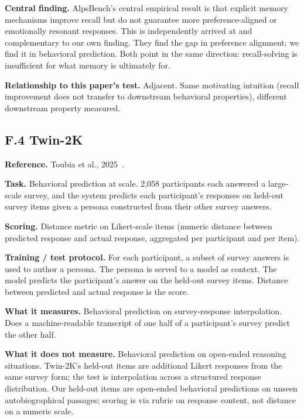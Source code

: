 \textbf{Central finding.} AlpsBench's central empirical result is that
explicit memory mechanisms improve recall but do not guarantee more
preference-aligned or emotionally resonant responses. This is
independently arrived at and complementary to our own finding. They find
the gap in preference alignment; we find it in behavioral prediction.
Both point in the same direction: recall-solving is insufficient for
what memory is ultimately for.

\textbf{Relationship to this paper's test.} Adjacent. Same motivating
intuition (recall improvement does not transfer to downstream behavioral
properties), different downstream property measured.

\hypertarget{f.4-twin-2k}{%
\subsection{F.4 Twin-2K}\label{f.4-twin-2k}}

\textbf{Reference.} Toubia et al., 2025~\citep{toubia2025twin2k}.

\textbf{Task.} Behavioral prediction at scale. 2,058 participants each
answered a large-scale survey, and the system predicts each
participant's responses on held-out survey items given a persona
constructed from their other survey answers.

\textbf{Scoring.} Distance metric on Likert-scale items (numeric
distance between predicted response and actual response, aggregated per
participant and per item).

\textbf{Training / test protocol.} For each participant, a subset of
survey answers is used to author a persona. The persona is served to a
model as context. The model predicts the participant's answer on the
held-out survey items. Distance between predicted and actual response is
the score.

\textbf{What it measures.} Behavioral prediction on survey-response
interpolation. Does a machine-readable transcript of one half of a
participant's survey predict the other half.

\textbf{What it does not measure.} Behavioral prediction on open-ended
reasoning situations. Twin-2K's held-out items are additional Likert
responses from the same survey form; the test is interpolation across a
structured response distribution. Our held-out items are open-ended
behavioral predictions on unseen autobiographical passages; scoring is
via rubric on response content, not distance on a numeric scale.

